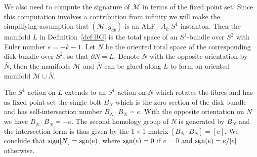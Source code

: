 \documentclass[a4paper,10pt,reqno]{amsart}
\newcommand{\sgn}{\mathop{\rm sgn}}
\newcommand{\sign}{\mathop{\rm sign}}
\newcommand{\cM}{\mathcal{M}}
\theoremstyle{plain}
\numberwithin{equation}{section}
\begin{document}
We also need to compute the signature of $\cM$ in terms of the fixed point set. Since this computation involves a contribution from infinity we will make the simplifying assumption that $(\cM, g_{ab})$ is an ALF$-A_k$ $S^1$ instanton. Then the manifold $L$ in Definition~\ref{def:BG} is the total space of an $S^1$-bundle over $S^2$ with Euler number $e = -k-1$. Let $N$ be the oriented total space of the corresponding disk bundle over $S^2$, so that $\partial N = L$. Denote $N$ with the opposite orientation by $\overline{N}$, then the manifolds $\cM$ and $\overline{N}$ can be glued along $L$ to form an oriented manifold $\cM \cup \overline{N}$. 

The $S^1$ action on $L$ extends to an $S^1$ action on $N$ which rotates the fibres and has as fixed point set the single bolt $B_N$ which is the zero section of the disk bundle and has self-intersection number $B_N \!\cdot\! B_N = e$. With the opposite orientation on $N$ we have $B_{\overline{N}} \! \cdot \! B_{\overline{N}} = -e$. The second homology group of $N$ is generated by $B_N$ and the intersection form is thus given by the $1 \times 1$ matrix $[B_N \! \cdot \! B_N] = [e]$. We conclude that $\sign[N] = \sgn(e)$, where $\sgn(e) = 0$ if $e=0$ and $\sgn(e) = e/|e|$ otherwise.
\end{document}
